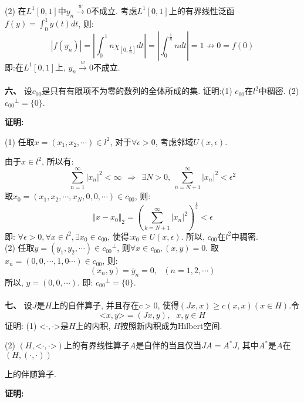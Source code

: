 \documentclass{article}
\begin{document}
(2) 在$L^1[0,1]$中$y_n \xrightarrow{w} 0$不成立. 考虑$L^1[0,1]$上的有界线性泛函$f(y) = \int_0^1 y(t)dt$, 则:
$$ |f(y_n)| = |\int_0^1 n \chi_{[0,\frac{1}{n}]}dt| =|\int_0^{\frac{1}{n}} ndt| = 1 \nrightarrow 0 = f(0) $$
即:在$L^1[0,1]$上, $y_n \xrightarrow{w} 0$不成立. \\  \\  

\textbf{六、} 设$c_{00}$是只有有限项不为零的数列的全体所成的集. 证明:(1) $c_{00}$在$l^2$中稠密. (2) ${c_{00}}^{\perp}= \{0 \}$. 

\textbf{证明:}

(1) 任取$ x = (x_1, x_2, \cdots) \in l^2 $, 对于$\forall \epsilon >0$, 考虑邻域$U(x, \epsilon)$.

由于$x \in l^2$, 所以有: 
$$ \sum\limits_{n=1}^{\infty} |x_n|^2 < \infty \ \ \Rightarrow \ \ \exists N>0, \ \sum\limits_{n=N+1}^{\infty} |x_n|^2 < \epsilon^2 $$
取$x_0 = (x_1, x_2, \cdots, x_N, 0, 0, \cdots) \in c_{00}$, 则:
$$ \Vert x-x_0 \Vert_2 = (\sum\limits_{k=N+1}^{\infty} |x_n|^2)^{\frac{1}{2}} < \epsilon $$
即: $\forall \epsilon >0, \forall x \in l^2, \exists x_0 \in c_{00}$, 使得:$x_0 \in U(x, \epsilon) $. 所以, $c_{00}$在$l^2$中稠密.   \\

(2) 任取$y=(y_1, y_2, \cdots) \in {c_{00}}^{\perp}$, 则$\forall x \in c_{00}, (x, y) = 0$. 取$x_n=(0,0, \cdots, 1, 0 \cdots) \in c_{00}$, 则:
$$ (x_n, y) = \overline{y}_n = 0, \ \ \ (n=1,2, \cdots) $$
所以, $y = (0, 0, \cdots)$. 即: ${c_{00}}^{\perp} = \{0 \}$. \\  \\  



\textbf{七、} 设$J$是$H$上的自伴算子, 并且存在$c>0$, 使得$(Jx, x) \geq c(x,x) (x \in H)$.令
$$ \text{<}x, y\text{>} = (Jx, y), \ \ \ x, y \in H $$
证明: (1) $\text{<}\cdot, \cdot\text{>}$是$H$上的内积, $H$按照新内积成为Hilbert空间. 

\hspace{2.4em} (2) $(H, \text{<}\cdot, \cdot\text{>})$上的有界线性算子$A$是自伴的当且仅当$JA=A^*J$, 其中$A^*$是$A$在$(H,(\cdot, \cdot))$

\hspace{4.1em} 上的伴随算子. 

\textbf{证明:}
\end{document}
